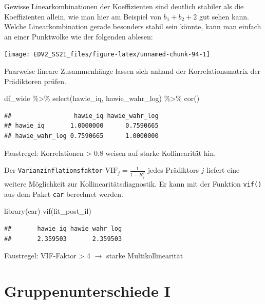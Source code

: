 \documentclass[
]{book}
\newenvironment{Shaded}{\begin{snugshade}}{\end{snugshade}}
\newcommand{\FunctionTok}[1]{\textcolor[rgb]{0.00,0.00,0.00}{#1}}
\newcommand{\NormalTok}[1]{#1}
\newcommand{\SpecialCharTok}[1]{\textcolor[rgb]{0.00,0.00,0.00}{#1}}
\begin{document}
Gewisse Linearkombinationen der Koeffizienten sind deutlich stabiler als die Koeffizienten allein, wie man hier am Beispiel von \(b_1 + b_2 + 2\) gut sehen kann. Welche Linearkombination gerade besonders stabil sein könnte, kann man einfach an einer Punktwolke wie der folgenden ablesen:

\begin{center}\texttt{[image: EDV2\_SS21\_files/figure-latex/unnamed-chunk-94-1]} \end{center}

Paarweise lineare Zusammenhänge lassen sich anhand der Korrelationsmatrix der Prädiktoren prüfen.

\begin{Shaded}
\begin{Highlighting}[]
\NormalTok{df\_wide }\SpecialCharTok{\%\textgreater{}\%} 
  \FunctionTok{select}\NormalTok{(hawie\_iq,}
\NormalTok{         hawie\_wahr\_log) }\SpecialCharTok{\%\textgreater{}\%} 
  \FunctionTok{cor}\NormalTok{()}
\end{Highlighting}
\end{Shaded}

\begin{verbatim}
##                 hawie_iq hawie_wahr_log
## hawie_iq       1.0000000      0.7590665
## hawie_wahr_log 0.7590665      1.0000000
\end{verbatim}

Faustregel: Korrelationen \textgreater{} 0.8 weisen auf starke Kollinearität hin.

Der \texttt{Varianzinflationsfaktor} \(\text{VIF}_j=\frac{1}{1-R_j^2}\) jedes Prädiktors \(j\) liefert eine weitere Möglichkeit zur Kollinearitätsdiagnostik. Er kann mit der Funktion \texttt{vif()} aus dem Paket \texttt{car} berechnet werden.

\begin{Shaded}
\begin{Highlighting}[]
\FunctionTok{library}\NormalTok{(car)}
\FunctionTok{vif}\NormalTok{(fit\_post\_il)}
\end{Highlighting}
\end{Shaded}

\begin{verbatim}
##       hawie_iq hawie_wahr_log 
##       2.359503       2.359503
\end{verbatim}

Faustregel: VIF-Faktor \textgreater{} 4 \(\rightarrow\) starke Multikollinearität

\hypertarget{gruppenunterschiede-i}{%
\chapter{Gruppenunterschiede I}\label{gruppenunterschiede-i}}
\end{document}
